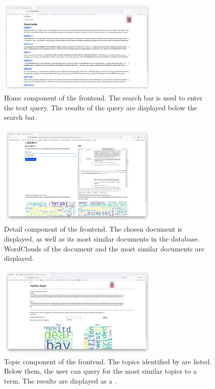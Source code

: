 \begin{figure}[htp] %
    \centering
    \includegraphics[width=0.7\textwidth]{images/UI/Home_component.png}
    \caption[Home component of the frontend]{Home component of the frontend.
    The search bar is used to enter the text query.
    The results of the query are displayed below the search bar.
    }
    \label{fig:home_comp}
\end{figure}


\begin{figure}[htp] %
    \centering
    \includegraphics[width=0.7\textwidth]{images/UI/Home_detail.png}
    \caption[Detail component of the frontend]{Detail component of the frontend.
    The chosen document is displayed, as well as its most similar documents in the database.
    WordClouds of the document and the most similar documents are displayed.
    }
    \label{fig:detail_comp}
\end{figure}


\begin{figure}[htp] %
    \centering
    \includegraphics[width=0.7\textwidth]{images/UI/Top2Vec_Topics.png}
    \caption[Topic component of the frontend]{Topic component of the frontend.
    The topics identified by \topTwovec{} are listed.
    Below them, the user can query for the most similar topics to a term.
    The results are displayed as a \wordcloud{}.
    }
    \label{fig:top2vec_topic_comp}
\end{figure}


